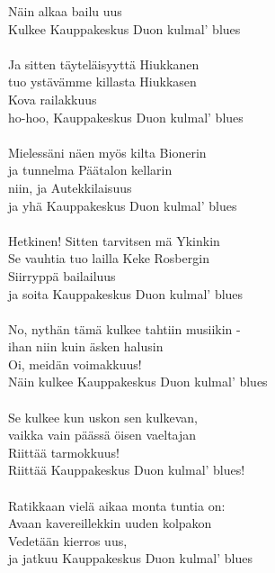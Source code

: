 Näin alkaa bailu uus \\
Kulkee Kauppakeskus Duon kulmal' blues \\
\hspace{10mm} \\
Ja sitten täyteläisyyttä Hiukkanen \\
tuo ystävämme killasta Hiukkasen \\
Kova railakkuus \\
ho-hoo, Kauppakeskus Duon kulmal' blues \\
\hspace{10mm} \\
Mielessäni näen myös kilta Bionerin \\
ja tunnelma Päätalon kellarin \\
niin, ja Autekkilaisuus \\
ja yhä Kauppakeskus Duon kulmal' blues \\
\hspace{10mm} \\
Hetkinen! Sitten tarvitsen mä Ykinkin \\
Se vauhtia tuo lailla Keke Rosbergin \\
Siirryppä bailailuus \\
ja soita Kauppakeskus Duon kulmal' blues \\
\hspace{10mm} \\
No, nythän tämä kulkee tahtiin musiikin - \\
ihan niin kuin äsken halusin \\
Oi, meidän voimakkuus! \\
Näin kulkee Kauppakeskus Duon kulmal' blues \\
\hspace{10mm} \\
Se kulkee kun uskon sen kulkevan, \\
vaikka vain päässä öisen vaeltajan \\
Riittää tarmokkuus! \\
Riittää Kauppakeskus Duon kulmal' blues! \\
\hspace{10mm} \\
Ratikkaan vielä aikaa monta tuntia on: \\
Avaan kavereillekkin uuden kolpakon \\
Vedetään kierros uus, \\
ja jatkuu Kauppakeskus Duon kulmal' blues \\
\hspace{10mm} \\
